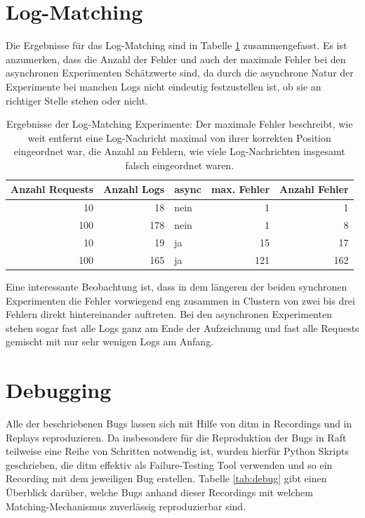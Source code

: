 \documentclass[12pt,a4paper]{report}
\begin{document}
\section{Log-Matching}
Die Ergebnisse für das Log-Matching sind in Tabelle \ref{tab:logs} zusammengefasst.
Es ist anzumerken, dass die Anzahl der Fehler und auch der maximale Fehler bei den asynchronen Experimenten Schätzwerte sind, da durch
die asynchrone Natur der Experimente bei manchen Logs nicht eindeutig festzustellen ist, ob sie an richtiger Stelle stehen oder nicht.
\begin{table}[H]
	\centering
	\caption{
		Ergebnisse der Log-Matching Experimente: Der maximale Fehler beschreibt, wie weit entfernt eine Log-Nachricht maximal von
		ihrer korrekten Position eingeordnet war, die Anzahl an Fehlern, wie viele Log-Nachrichten insgesamt falsch eingeordnet waren.
	}
	\label{tab:logs}
	\begin{tabular}{|r|r|l|r|r|}
		\hline
		Anzahl Requests & Anzahl Logs & async & max. Fehler & Anzahl Fehler \\ \hline
		10              & 18          & nein  & 1           & 1             \\ \hline
		100             & 178         & nein  & 1           & 8             \\ \hline
		10              & 19          & ja    & 15          & 17            \\ \hline
		100             & 165         & ja    & 121         & 162           \\ \hline
	\end{tabular}
\end{table}

Eine interessante Beobachtung ist, dass in dem längeren der beiden synchronen Experimenten die Fehler vorwiegend eng zusammen in Clustern
von zwei bis drei Fehlern direkt hintereinander auftreten. Bei den asynchronen Experimenten stehen sogar fast alle Logs ganz am Ende der Aufzeichnung
und fast alle Requests gemischt mit nur sehr wenigen Logs am Anfang.

\section{Debugging}
Alle der beschriebenen Bugs lassen sich mit Hilfe von ditm in Recordings und in Replays reproduzieren. Da insbesondere für die
Reproduktion der Bugs in Raft teilweise eine Reihe von Schritten notwendig ist, wurden hierfür Python Skripts geschrieben, die
ditm effektiv als Failure-Testing Tool verwenden und so ein Recording mit dem jeweiligen Bug erstellen. Tabelle \ref{tab:debug}
gibt einen Überblick darüber, welche Bugs anhand dieser Recordings mit welchem Matching-Mechanismus zuverlässig reproduzierbar
sind.
\end{document}
